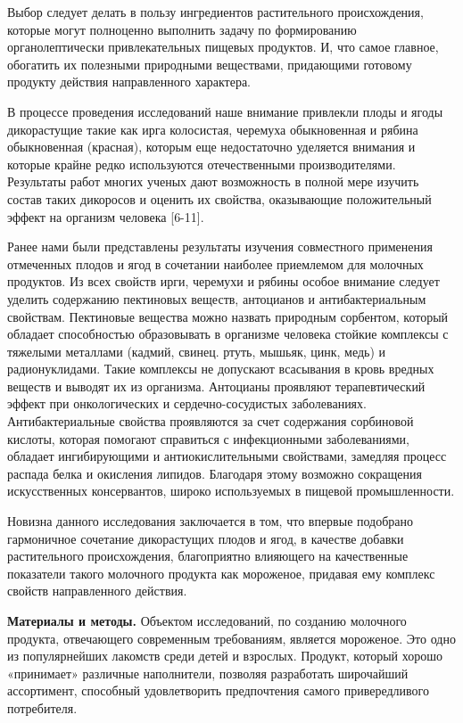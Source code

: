 {{Выбор следует делать в пользу ингредиентов растительного происхождения,
которые могут полноценно выполнить задачу по формированию
органолептически привлекательных пищевых продуктов. И, что самое
главное, обогатить их полезными природными веществами, придающими
готовому продукту действия направленного характера.

В процессе проведения исследований наше внимание привлекли плоды и ягоды
дикорастущие такие как ирга колосистая, черемуха обыкновенная и рябина
обыкновенная (красная), которым еще недостаточно уделяется внимания и
которые крайне редко используются отечественными производителями.
Результаты работ многих ученых дают возможность в полной мере изучить
состав таких дикоросов и оценить их свойства, оказывающие положительный
эффект на организм человека {[}6-11{]}.

Ранее нами были представлены результаты изучения совместного применения
отмеченных плодов и ягод в сочетании наиболее приемлемом для молочных
продуктов. Из всех свойств ирги, черемухи и рябины особое внимание
следует уделить содержанию пектиновых веществ, антоцианов и
антибактериальным свойствам. Пектиновые вещества можно назвать природным
сорбентом, который обладает способностью образовывать в организме
человека стойкие комплексы с тяжелыми металлами (кадмий, свинец. ртуть,
мышьяк, цинк, медь) и радионуклидами. Такие комплексы не допускают
всасывания в кровь вредных веществ и выводят их из организма. Антоцианы
проявляют терапевтический эффект при онкологических и
сердечно-сосудистых заболеваниях. Антибактериальные свойства проявляются
за счет содержания сорбиновой кислоты, которая помогают справиться с
инфекционными заболеваниями, обладает ингибирующими и антиокислительными
свойствами, замедляя процесс распада белка и окисления липидов.
Благодаря этому возможно сокращения искусственных консервантов, широко
используемых в пищевой промышленности.

Новизна данного исследования заключается в том, что впервые подобрано
гармоничное сочетание дикорастущих плодов и ягод, в качестве добавки
растительного происхождения, благоприятно влияющего на качественные
показатели такого молочного продукта как мороженое, придавая ему
комплекс свойств направленного действия.

{\bfseries Материалы и методы.} Объектом исследований, по созданию
молочного продукта, отвечающего современным требованиям, является
мороженое. Это одно из популярнейших лакомств среди детей и взрослых.
Продукт, который хорошо «принимает» различные наполнители, позволяя
разработать широчайший ассортимент, способный удовлетворить предпочтения
самого привередливого потребителя.

}}

